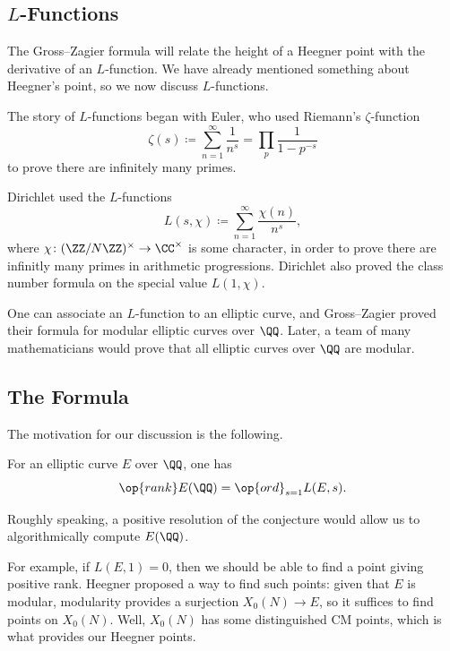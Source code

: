 \documentclass{article}
\begin{document}
\subsection{\texorpdfstring{$L$}{L}-Functions}
The Gross--Zagier formula will relate the height of a Heegner point with the derivative of an $L$-function. We have already mentioned something about Heegner's point, so we now discuss $L$-functions.
\begin{example}
	The story of $L$-functions began with Euler, who used Riemann's $\zeta$-function
	\[\zeta(s)\coloneqq\sum_{n=1}^\infty\frac1{n^s}=\prod_p\frac1{1-p^{-s}}\]
	to prove there are infinitely many primes.
\end{example}
\begin{example}
	Dirichlet used the $L$-functions
	\[L(s,\chi)\coloneqq\sum_{n=1}^\infty\frac{\chi(n)}{n^s},\]
	where $\chi\colon(\ZZ/N\ZZ)^\times\to\CC^\times$ is some character, in order to prove there are infinitly many primes in arithmetic progressions. Dirichlet also proved the class number formula on the special value $L(1,\chi)$.
\end{example}
One can associate an $L$-function to an elliptic curve, and Gross--Zagier proved their formula for modular elliptic curves over $\QQ$. Later, a team of many mathematicians would prove that all elliptic curves over $\QQ$ are modular.

\subsection{The Formula}
The motivation for our discussion is the following.
\begin{conj}
	For an elliptic curve $E$ over $\QQ$, one has
	\[\op{rank}E(\QQ)=\op{ord}_{s=1}L(E,s).\]
\end{conj}
Roughly speaking, a positive resolution of the conjecture would allow us to algorithmically compute $E(\QQ)$.

For example, if $L(E,1)=0$, then we should be able to find a point giving positive rank. Heegner proposed a way to find such points: given that $E$ is modular, modularity provides a surjection $X_0(N)\to E$, so it suffices to find points on $X_0(N)$. Well, $X_0(N)$ has some distinguished CM points, which is what provides our Heegner points.
\end{document}
